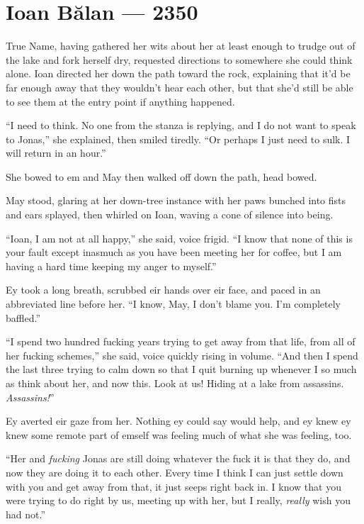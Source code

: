 \hypertarget{ioan-bux103lan-2350}{%
\chapter{Ioan Bălan — 2350}\label{ioan-bux103lan-2350}}

True Name, having gathered her wits about her at least enough to trudge out of the lake and fork herself dry, requested directions to somewhere she could think alone. Ioan directed her down the path toward the rock, explaining that it'd be far enough away that they wouldn't hear each other, but that she'd still be able to see them at the entry point if anything happened.

``I need to think. No one from the stanza is replying, and I do not want to speak to Jonas,'' she explained, then smiled tiredly. ``Or perhaps I just need to sulk. I will return in an hour.''

She bowed to em and May then walked off down the path, head bowed.

May stood, glaring at her down-tree instance with her paws bunched into fists and ears splayed, then whirled on Ioan, waving a cone of silence into being.

``Ioan, I am not at all happy,'' she said, voice frigid. ``I know that none of this is your fault except inasmuch as you have been meeting her for coffee, but I am having a hard time keeping my anger to myself.''

Ey took a long breath, scrubbed eir hands over eir face, and paced in an abbreviated line before her. ``I know, May, I don't blame you. I'm completely baffled.''

``I spend two hundred fucking years trying to get away from that life, from all of her fucking schemes,'' she said, voice quickly rising in volume. ``And then I spend the last three trying to calm down so that I quit burning up whenever I so much as think about her, and now this. Look at us! Hiding at a lake from assassins. \emph{Assassins!}''

Ey averted eir gaze from her. Nothing ey could say would help, and ey knew ey knew some remote part of emself was feeling much of what she was feeling, too.

``Her and \emph{fucking} Jonas are still doing whatever the fuck it is that they do, and now they are doing it to each other. Every time I think I can just settle down with you and get away from that, it just seeps right back in. I know that you were trying to do right by us, meeting up with her, but I really, \emph{really} wish you had not.''

